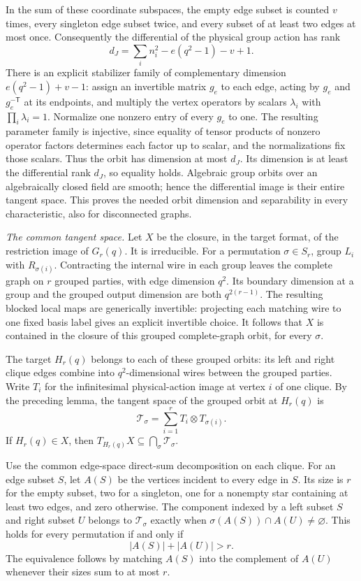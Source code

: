 In the sum of these coordinate subspaces, the empty edge
subset is counted $v$ times, every singleton edge subset
twice, and every subset of at least two edges at most once.
Consequently the differential of the physical group action
has rank
\[
 d_J=\sum_i n_i^2-e(q^2-1)-v+1.
 \tag{EX37.1}
\]
There is an explicit stabilizer family of complementary
dimension $e(q^2-1)+v-1$: assign an invertible matrix $g_e$
to each edge, acting by $g_e$ and $g_e^{-\mathsf T}$ at
its endpoints, and multiply the vertex operators by
scalars $\lambda_i$ with $\prod_i\lambda_i=1$.
Normalize one nonzero entry of every $g_e$ to one.
The resulting parameter family is injective, since equality
of tensor products of nonzero operator factors determines
each factor up to scalar, and the normalizations fix those
scalars. Thus the orbit has dimension at most $d_J$.
Its dimension is at least the differential rank $d_J$,
so equality holds. Algebraic group orbits over an
algebraically closed field are smooth; hence the
differential image is their entire tangent space.
This proves the needed orbit dimension and separability
in every characteristic, also for disconnected graphs.

\emph{The common tangent space.}
Let $X$ be the closure, in the target format, of the
restriction image of $G_r(q)$. It is irreducible.
For a permutation $\sigma\in S_r$, group $L_i$ with
$R_{\sigma(i)}$. Contracting the internal wire in each
group leaves the complete graph on $r$ grouped parties,
with edge dimension $q^2$. Its boundary dimension at a
group and the grouped output dimension are both
$q^{2(r-1)}$. The resulting blocked local maps are
generically invertible: projecting each matching wire to
one fixed basis label gives an explicit invertible choice.
It follows that $X$ is contained in the closure of this
grouped complete-graph orbit, for every $\sigma$.

The target $H_r(q)$ belongs to each of these grouped
orbits: its left and right clique edges combine into
$q^2$-dimensional wires between the grouped parties.
Write $T_i$ for the infinitesimal physical-action image
at vertex $i$ of one clique. By the preceding lemma,
the tangent space of the grouped orbit at $H_r(q)$ is
\[
 \mathcal T_\sigma=\sum_{i=1}^r T_i\otimes T_{\sigma(i)}.
 \tag{EX37.2}
\]
If $H_r(q)\in X$, then
$T_{H_r(q)}X\subseteq\bigcap_\sigma\mathcal T_\sigma$.

Use the common edge-space direct-sum decomposition on
each clique. For an edge subset $S$, let $A(S)$ be the
vertices incident to every edge in $S$. Its size is $r$
for the empty subset, two for a singleton, one for a
nonempty star containing at least two edges, and zero
otherwise. The component indexed by a left subset $S$
and right subset $U$ belongs to $\mathcal T_\sigma$
exactly when $\sigma(A(S))\cap A(U)\ne\varnothing$.
This holds for every permutation if and only if
\[
 |A(S)|+|A(U)|>r.
 \tag{EX37.3}
\]
The equivalence follows by matching $A(S)$ into the
complement of $A(U)$ whenever their sizes sum to at
most $r$.

